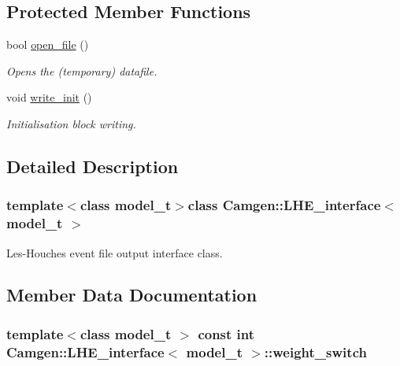 \subsection*{Protected Member Functions}
\begin{DoxyCompactItemize}
\item 
\hypertarget{a00327_a67cf6b11cd11c9d97e7eda381024de55}{}bool \hyperlink{a00327_a67cf6b11cd11c9d97e7eda381024de55}{open\+\_\+file} ()\label{a00327_a67cf6b11cd11c9d97e7eda381024de55}

\begin{DoxyCompactList}\small\item\em Opens the (temporary) datafile. \end{DoxyCompactList}\item 
\hypertarget{a00327_a22cd41958e840759ec9912f53c081c1b}{}void \hyperlink{a00327_a22cd41958e840759ec9912f53c081c1b}{write\+\_\+init} ()\label{a00327_a22cd41958e840759ec9912f53c081c1b}

\begin{DoxyCompactList}\small\item\em Initialisation block writing. \end{DoxyCompactList}\end{DoxyCompactItemize}


\subsection{Detailed Description}
\subsubsection*{template$<$class model\+\_\+t$>$class Camgen\+::\+L\+H\+E\+\_\+interface$<$ model\+\_\+t $>$}

Les-\/\+Houches event file output interface class. 

\subsection{Member Data Documentation}
\hypertarget{a00327_a067bf1d9ce6ef519da53c80d422b89dd}{}
\subsubsection[{weight\+\_\+switch}]{\setlength{\rightskip}{0pt plus 5cm}template$<$class model\+\_\+t $>$ const int {\bf Camgen\+::\+L\+H\+E\+\_\+interface}$<$ model\+\_\+t $>$\+::weight\+\_\+switch}\label{a00327_a067bf1d9ce6ef519da53c80d422b89dd}



